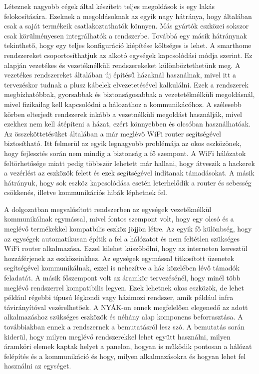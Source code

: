 Léteznek nagyobb cégek által készített teljes megoldások is egy lakás felokosítására. Ezeknek a megoldásoknak az egyik nagy hátránya, hogy általában csak a saját termékeik csatlakoztathatók könnyen. Más gyártók eszközei sokszor csak körülményesen integrálhatók a rendszerbe. Továbbá egy másik hátránynak tekinthető, hogy egy teljes konfiguráció kiépítése költséges is lehet. A smarthome rendszereket csoportosíthatjuk az alkotó egységek kapcsolódási módja szerint. Ez alapján vezetékes és vezetéknélküli rendszerekeket különböztethetünk meg. A vezetékes rendszereket általában új építésű házaknál használnak, mivel itt a tervezéskor tudnak a plusz kábelek elvezetetésével kalkulálni. Ezek a rendszerek megbízhatóbbak, gyorsabbak és biztonságosabbak a vezetetéknélküli megoldásnál, mivel fizikailag kell kapcsolódni a hálozathoz a kommunikácóhoz. A szélesebb körben elterjedt rendszerek inkább a vezetnélküli megoldást használják, mivel ezekhez nem kell átépíteni a házat, ezért könnyebben és olcsóban használhatóak. Az összeköttetésüket általában a már meglévő WiFi router segítségével biztosítható. Itt felmerül az egyik legnagyobb problémája az okos eszközönek, hogy fejlesztés során nem mindig a biztonság a fő szempont. A WiFi hálózatok feltörhetősége miatt pedig többször lehetett már hallani, hogy átveszik a hackerek a vezérlést az eszközök felett és ezek segítségével indítanak támadásokat. A másik hátrányuk, hogy sok eszköz kapcsolódása esetén leterhelődik a router és sebesség csökkenés, illetve kommunikációs hibák léphetnek fel.

A dolgozatban megvalósított rendszerben az egységek vezetéknélkül kommunikálnak egymással, mivel fontos szempont volt, hogy egy olcsó és a meglévő termékekkel kompatbilis eszköz jöjjön létre. Az egyik fő különbség, hogy az egységek automatikusan építik a fel a hálózatot és nem feltétlen szükséges WiFi router alkalmazása. Ezzel kilehet küszöbölni, hogy az interneten keresztül hozzáférjenek az eszközeinkhez. Az egységek egymással titkosított üzenetek segítségével kommunikálnak, ezzel is nehezítve a ház közelében lévő támadók feladatát. A másik főszempont volt az áramkör tervezésénél, hogy minél több meglévő rendszerrel kompatibilis legyen. Ezek lehetnek okos eszközök, de lehet például régebbi típusú légkondi vagy házimozi rendszer, amik például infra távirányítóval vezérelhetőek. A NYÁK-on ennek megfelelően elegenedő az adott alkalmazáshoz szükséges eszközök és néhány alap komponens beforrasztása.
A továbbiakban ennek a rendszernek a bemutatásról lesz szó. A bemutatás során kiderül, hogy milyen meglévő rendszerekkel lehet együtt használni, milyen áramköri elemek kaptak helyet a panelon, hogyan is működik pontosan a hálózat felépítés és a kommunikáció és hogy, milyen alkalmazásokra és hogyan lehet fel használni az egységet. 


